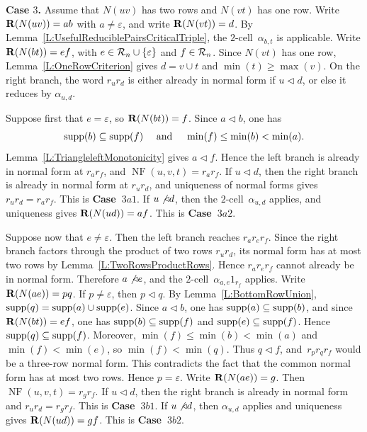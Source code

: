 \documentclass[a4paper, twoside, 11pt, english]{article}
\begin{document}
\medskip

\noindent
\textbf{Case $3$.}
Assume that $N(uv)$ has two rows and $N(vt)$ has one row. Write
$\mathbf{R}(N(uv))=ab$ with $a\neq\varepsilon$, and write $\mathbf{R}(N(vt))=d$.
By Lemma~\ref{L:UsefulReduciblePairsCriticalTriple}, the $2$-cell~$\alpha_{b,t}$ is applicable. Write $\mathbf{R}(N(bt))=ef$, with
$e\in\mathcal{R}_n\cup\{\varepsilon\}$ and $f\in\mathcal{R}_n$.
Since $N(vt)$ has one row, Lemma~\ref{L:OneRowCriterion} gives
$d=v\cup t$ and $\min(t)\ge\max(v)$. On the right branch, the word
$r_u r_d$ is either already in normal form if $u\triangleleft d$, or else it
reduces by $\alpha_{u,d}$.

Suppose first that $e=\varepsilon$, so $\mathbf{R}(N(bt))=f$. Since
$a\triangleleft b$, one has
\[
\operatorname{supp}(b)\subseteq\operatorname{supp}(f)\quad  \text{ and } \quad \min(f)\le\min(b)<\min(a).
\]
Lemma~\ref{L:TriangleleftMonotonicity} gives
$a\triangleleft f$. Hence the left branch is already in normal form at
$r_a r_f$, and $\operatorname{NF}(u,v,t)=r_a r_f$.
If $u\triangleleft d$, then the right branch is already in normal form at
$r_u r_d$, and uniqueness of normal forms gives $r_u r_d=r_a r_f$. This is
\textbf{Case~$3a1$}. 
If $u\not\triangleleft d$, then the $2$-cell~$\alpha_{u,d}$ applies,
and uniqueness gives $\mathbf{R}(N(ud))=af$. This is \textbf{Case~$3a2$}.

Suppose now that $e\neq\varepsilon$. Then the left branch reaches
$r_a r_e r_f$. Since the right branch factors through the product of two rows
$r_u r_d$, its normal form has at most two rows by
Lemma~\ref{L:TwoRowsProductRows}. Hence $r_a r_e r_f$ cannot already be in
normal form. Therefore $a\not\triangleleft e$, and the $2$-cell~$\alpha_{a,e}1_{r_f}$ applies.
Write $\mathbf{R}(N(ae))=pq$. If $p\neq\varepsilon$, then $p\triangleleft q$.
By Lemma~\ref{L:BottomRowUnion}, $\operatorname{supp}(q)=\operatorname{supp}(a)\cup\operatorname{supp}(e)$. Since
$a\triangleleft b$, one has $\operatorname{supp}(a)\subseteq\operatorname{supp}(b)$, and since
$\mathbf{R}(N(bt))=ef$, one has $\operatorname{supp}(b)\subseteq\operatorname{supp}(f)$ and
$\operatorname{supp}(e)\subseteq\operatorname{supp}(f)$. Hence $\operatorname{supp}(q)\subseteq\operatorname{supp}(f)$. Moreover,
$\min(f)\le\min(b)<\min(a)$ and $\min(f)<\min(e)$, so
$\min(f)<\min(q)$. Thus $q\triangleleft f$, and~$r_p r_q r_f$ would be a
three-row normal form. This contradicts the fact that the common normal form
has at most two rows. Hence $p=\varepsilon$. Write $\mathbf{R}(N(ae))=g$. Then
$\operatorname{NF}(u,v,t)=r_g r_f$.
If $u\triangleleft d$, then the right branch is already in normal form and
$r_u r_d=r_g r_f$. This is \textbf{Case~$3b1$}. If $u\not\triangleleft d$, then
$\alpha_{u,d}$ applies and uniqueness gives $\mathbf{R}(N(ud))=gf$. This is
\textbf{Case~$3b2$}.
\end{document}
